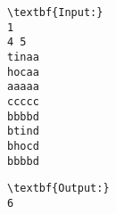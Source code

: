 \begin{verbatim}
\textbf{Input:}
1
4 5
tinaa
hocaa
aaaaa
ccccc
bbbbd
btind
bhocd
bbbbd\end{verbatim}
\begin{verbatim}
\textbf{Output:}
6\end{verbatim}